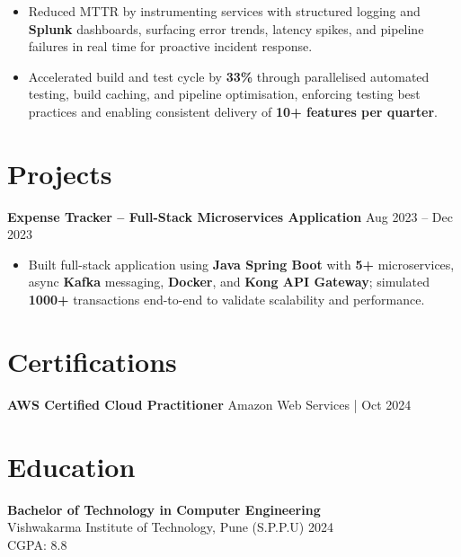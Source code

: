 \documentclass[letterpaper,10pt]{article}
\begin{document}
\begin{itemize}[leftmargin=*]
    \item Reduced MTTR by instrumenting services with structured logging and \textbf{Splunk} dashboards, surfacing error trends, latency spikes, and pipeline failures in real time for proactive incident response.
    \item Accelerated build and test cycle by \textbf{33\%} through parallelised automated testing, build caching, and pipeline optimisation, enforcing testing best practices and enabling consistent delivery of \textbf{10+ features per quarter}.
\end{itemize}

\section*{Projects}

\textbf{Expense Tracker -- Full-Stack Microservices Application} \hfill Aug 2023 -- Dec 2023
\begin{itemize}[leftmargin=*]
    \item Built full-stack application using \textbf{Java Spring Boot} with \textbf{5+} microservices, async \textbf{Kafka} messaging, \textbf{Docker}, and \textbf{Kong API Gateway}; simulated \textbf{1000+} transactions end-to-end to validate scalability and performance.
\end{itemize}

\section*{Certifications}
\textbf{AWS Certified Cloud Practitioner} \hfill Amazon Web Services \;|\; Oct 2024 \\

\section*{Education}
\textbf{Bachelor of Technology in Computer Engineering} \\
Vishwakarma Institute of Technology, Pune (S.P.P.U) \hfill 2024 \\
CGPA: 8.8
\end{document}

